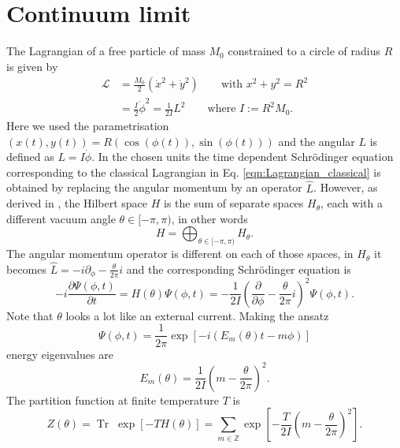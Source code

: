 \documentclass[11pt]{article}
\begin{document}
\section{Continuum limit}
The Lagrangian of a free particle of mass $M_0$ constrained to a circle of radius $R$ is given by
\begin{equation}
\begin{aligned}
  \mathcal{L} &= \frac{M_0}{2}\left(\dot{x}^2+\dot{y}^2\right)\qquad\text{with $x^2+y^2=R^2$}\\
&= \frac{I}{2}\dot{\phi}^2=\frac{1}{2I} L^2 \qquad{\text{where $I:=R^2M_0$}}.
\end{aligned}
\label{eqn:Lagrangian_classical}
\end{equation}
Here we used the parametrisation $(x(t),y(t))=R(\cos(\phi(t)),\sin(\phi(t)))$ and the angular $L$ is defined as $L=I\dot{\phi}$. In the chosen units the time dependent Schr\"{o}dinger equation corresponding to the classical Lagrangian in Eq. \eqref{eqn:Lagrangian_classical} is obtained by replacing the angular momentum by an operator $\hat{L}$. However, as derived in \cite{Tanimura1994}, the Hilbert space $H$ is the sum of separate spaces $H_\theta$, each with a different vacuum angle $\theta\in[-\pi,\pi)$, in other words
  \begin{equation}
    H=\bigoplus_{\theta\in[-\pi,\pi)} H_\theta.
  \end{equation}
  The angular momentum operator is different on each of those spaces, in $H_\theta$ it becomes $\hat{L}=-i\partial_\phi-\frac{\theta}{2\pi}i$ and the corresponding Schr\"{o}dinger equation is
\begin{equation}
  -i\frac{\partial{\Psi(\phi,t)}}{\partial t} = H(\theta)\Psi(\phi,t)=-\frac{1}{2I} \left(\frac{\partial}{\partial \phi}-\frac{\theta}{2\pi}i\right)^2\Psi(\phi,t).\label{eqn:Schroedinger}
\end{equation}
Note that $\theta$ looks a lot like an external current. Making the ansatz
\begin{equation}
  \Psi(\phi,t) = \frac{1}{2\pi}\exp\left[-i(E_m(\theta)t-m\phi)\right]
\end{equation}
energy eigenvalues are
\begin{equation}
  E_m(\theta) = \frac{1}{2I}\left(m-\frac{\theta}{2\pi}\right)^2.
  \label{eqn:energy_continuum}
\end{equation}
The partition function at finite temperature $T$ is
\begin{equation}
  Z(\theta) = \operatorname{Tr}\;\exp\left[-TH(\theta)\right]
  = \sum_{m\in\mathbb{Z}} \exp\left[-\frac{T}{2I}\left(m-\frac{\theta}{2\pi}\right)^2\right].
\end{equation}
\end{document}
